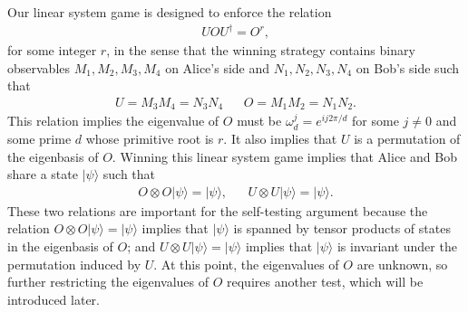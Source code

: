 \documentclass[11pt,letterpaper]{article}
\newcommand{\ket}[1]{|#1\rangle}
\newcommand{\x}{\otimes}
\newcommand{\ct}{^{\dagger}}
\newcommand{\1}{\mathbb{1}}
\theoremstyle{definition}
\begin{document}
Our linear system game is designed to enforce the relation 
\begin{align*}
    U O U\ct = O^r,
\end{align*}
for some integer $r$,
in the sense that the winning strategy contains binary observables
$M_1, M_2, M_3, M_4$ on Alice's side and 
$N_1, N_2, N_3, N_4$ on Bob's side such that 
\begin{align*}
    U = M_3M_4 = N_3N_4 && O = M_1M_2 = N_1N_2.
\end{align*}
This relation implies the eigenvalue of $O$ must be $\omega_d^j = e^{ij2\pi/d}$ for some $j \neq 0$ and some prime $d$ whose primitive root
is $r$. It also implies that $U$ is a permutation of the eigenbasis of $O$.
Winning this linear system game implies that Alice and Bob share a state
$\ket{\psi}$ such that
\begin{align*}
    O \x O \ket{\psi} = \ket{\psi}, && 
    U \x U \ket{\psi} = \ket{\psi}.
\end{align*}
These two relations are important for the self-testing argument
because
the relation $O \x O \ket{\psi} = \ket{\psi}$ implies that $\ket{\psi}$
is spanned by tensor products of states in the eigenbasis of $O$;
and $U \x U \ket{\psi} = \ket{\psi}$ implies that $\ket{\psi}$ is invariant
under the permutation induced by $U$. 
At this point, the eigenvalues of $O$ are unknown, so
further restricting the eigenvalues of $O$ requires another test, 
which will be introduced later.
\end{document}
